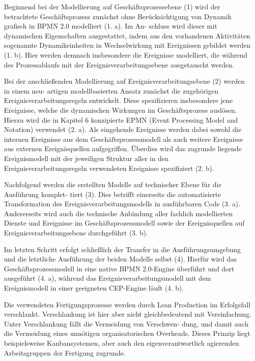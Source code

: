 
Beginnend bei der Modellierung auf Geschäftsprozessebene (1) wird der betrachtete Geschäftsprozess zunächst ohne Berücksichtigung von Dynamik grafisch in BPMN 2.0 modelliert (1. a). Im An- schluss wird dieser mit dynamischen Eigenschaften ausgestattet, indem aus den vorhandenen Aktivitäten sogenannte Dynamikeinheiten in Wechselwirkung mit Ereignissen gebildet werden (1. b). Hier werden demnach insbesondere die Ereignisse modelliert, die während des Prozessablaufs mit der Ereignisverarbeitungsebene ausgetauscht werden.

Bei der anschließenden Modellierung auf Ereignisverarbeitungsebene (2) werden in einem neu- artigen modellbasierten Ansatz zunächst die zugehörigen Ereignisverarbeitungsregeln entwickelt. Diese spezifizieren insbesondere jene Ereignisse, welche die dynamischen Wirkungen im Geschäftsprozess auslösen. Hierzu wird die in Kapitel 6 konzipierte EPMN (Event Processing Model and Notation) verwendet (2. a). Als eingehende Ereignisse werden dabei sowohl die internen Ereignisse aus dem Geschäftsprozessmodell als auch weitere Ereignisse aus externen Ereignisquellen aufgegriffen. Überdies wird das zugrunde liegende Ereignismodell mit der jeweiligen Struktur aller in den Ereignisverarbeitungsregeln verwendeten Ereignisse spezifiziert (2. b).

Nachfolgend werden die erstellten Modelle auf technischer Ebene für die Ausführung komplet- tiert (3). Dies betrifft einerseits die automatisierte Transformation des Ereignisverarbeitungsmodells in ausführbaren Code (3. a). Andererseits wird auch die technische Anbindung aller fachlich modellierten Dienste und Ereignisse im Geschäftsprozessmodell sowie der Ereignisquellen auf Ereignisverarbeitungsebene durchgeführt (3. b).

Im letzten Schritt erfolgt schließlich der Transfer in die Ausführungsumgebung und die letztliche Ausführung der beiden Modelle selbst (4). Hierfür wird das Geschäftsprozessmodell in eine native BPMN 2.0-Engine überführt und dort ausgeführt (4. a), während das Ereignisverarbeitungsmodell mit dem Ereignismodell in einer geeigneten CEP-Engine läuft (4. b).


Die verwendeten Fertigungsprozesse werden durch Lean Production im Erfolgsfall verschlankt. Verschlankung ist hier aber nicht gleichbedeutend mit Vereinfachung. Unter Verschlankung fällt die Vermeidung von Verschwen- dung, und damit auch die Vermeidung eines unnötigen organisatorischen Overheads. Dieses Prinzip liegt beispielsweise Kanbansystemen, aber auch den eigenverantwortlich agierenden Arbeitsgruppen der Fertigung zugrunde.



